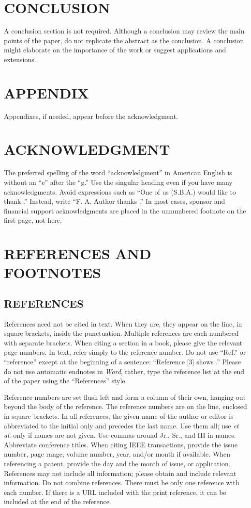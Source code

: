 \documentclass{IEEEoj}
\begin{document}
\section{CONCLUSION}
A conclusion section is not required. Although a conclusion may review the 
main points of the paper, do not replicate the abstract as the conclusion. A 
conclusion might elaborate on the importance of the work or suggest 
applications and extensions.

\section*{APPENDIX}
Appendixes, if needed, appear before the acknowledgment.

\section*{ACKNOWLEDGMENT}
The preferred spelling of the word ``acknowledgment'' in American English is 
without an ``e'' after the ``g.'' Use the singular heading even if you have 
many acknowledgments. Avoid expressions such as ``One of us (S.B.A.) would 
like to thank \textellipsis .'' Instead, write ``F. A. Author thanks \textellipsis .'' In most 
cases, sponsor and financial support acknowledgments are placed in the 
unnumbered footnote on the first page, not here.

\section*{REFERENCES AND FOOTNOTES}
\subsection{REFERENCES}
References need not be cited in text. When they are, they appear on the 
line, in square brackets, inside the punctuation. Multiple references are 
each numbered with separate brackets. When citing a section in a book, 
please give the relevant page numbers. In text, refer simply to the 
reference number. Do not use ``Ref.'' or ``reference'' except at the 
beginning of a sentence: ``Reference [3] shows \textellipsis .'' Please do not use 
automatic endnotes in \textit{Word}, rather, type the reference list at the end of the 
paper using the ``References'' style.

Reference numbers are set flush left and form a column of their own, hanging 
out beyond the body of the reference. The reference numbers are on the line, 
enclosed in square brackets. In all references, the given name of the author 
or editor is abbreviated to the initial only and precedes the last name. Use 
them all; use \textit{et al}. only if names are not given. Use commas around Jr., Sr., and 
III in names. Abbreviate conference titles. When citing IEEE transactions, 
provide the issue number, page range, volume number, year, and/or month if 
available. When referencing a patent, provide the day and the month of 
issue, or application. References may not include all information; please 
obtain and include relevant information. Do not combine references. There 
must be only one reference with each number. If there is a URL included with 
the print reference, it can be included at the end of the reference. 
\end{document}
